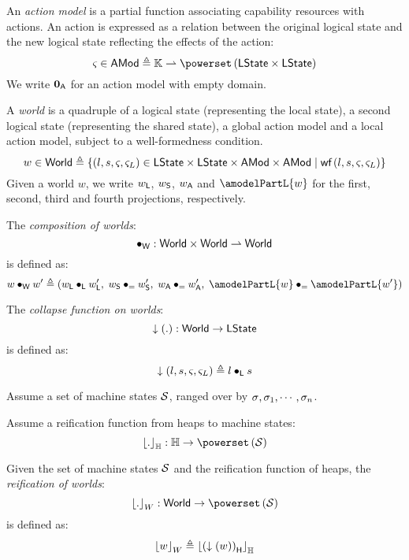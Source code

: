 %
%
\begin{definition}
An \emph{action model} is a partial function associating capability resources with actions. An action is expressed as a relation between the original logical state and the new logical state reflecting the effects of the action:
%
\[
	\amod{} \in \AMods \eqdef \Caps \rightharpoonup \pset{\LState \times \LState}
\]
%
We write $\mathbf{0}_{\textsf{A}}$ for an action model with empty domain.
\end{definition}
%
%
\begin{definition}[Worlds]
A \emph{world} is a quadruple of a logical state (representing the local state), a second logical state (representing the shared state), a global action model and a local action model, subject to a well-formedness condition.
%
\[
	w \in \textsf{World} \triangleq \left\{ (l, s, \varsigma_{}, \varsigma_{L}) \in \textsf{LState} \times \textsf{LState} \times \textsf{AMod} \times \textsf{AMod} \;|\; \textsf{wf}\left( l, s, \varsigma_{}, \varsigma_{L} \right) \right\}
\]
% 
Given a world $w$, we write $w_{\textsf{L}}$, $w_{\textsf{S}}$, $w_{\textsf{A}}$ and $\amodelPartL{w}$ for the first, second, third and fourth projections, respectively.
% 
\end{definition}
%
%
\begin{definition}
The \emph{composition of worlds}:
%
\[
	\bullet_{\textsf{W}} : \textsf{World} \times \textsf{World} \rightharpoonup \textsf{World}
\]
%
is defined as:
%
\[
	w \composeW w' \eqdef (\localPart{w} \composeL \localPart{w'},\; \sharedPart{w} \composeS \sharedPart{w'},\; \amodelPart{w} \composeAM \amodelPart{w'},\; \amodelPartL{w} \composeAM \amodelPartL{w'})
\]
%
\end{definition}
%
%
\begin{definition}
The \emph{collapse function on worlds}:
%
\[
	\downarrow\left(.\right): \textsf{World} \rightarrow \textsf{LState}
\]
%
is defined as:
%
\[
	\downarrow\left(l, s, \varsigma_{}, \varsigma_{L}\right) \triangleq l \bullet_{\textsf{L}} s
\]
%
\end{definition}
%
%
%
\begin{parameter}
Assume a set of machine states $\mathcal{S}$, ranged over by $\sigma_{}, \sigma_{1}, \cdots, \sigma_{n}$.
\end{parameter}
%
%
\begin{parameter}
Assume a reification function from heaps to machine states:
%
\[
	\reifyH{.}: \Heaps \rightarrow \pset{\MStates} 
\]
%
\end{parameter}
%
%
\begin{definition}[Reification]
Given the set of machine states $\mathcal{S}$ and the reification function of heaps, the \emph{reification of worlds}:
%
\[
	\reifyW{.} : \Worlds \rightarrow \pset{\MStates}
\]
%
is defined as:
%
\[
	\left\lfloor w \right\rfloor_{W} \triangleq \left\lfloor \left(\downarrow\left(w\right)\right)_{\textsf{H}} \right\rfloor_{\mathbb{H}}
\]
%
\end{definition}
%
